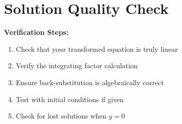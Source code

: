 \documentclass[12pt]{article}
\begin{document}
\section{Solution Quality Check}

\begin{keypoint}
\textbf{Verification Steps:}
\begin{enumerate}
    \item Check that your transformed equation is truly linear
    \item Verify the integrating factor calculation
    \item Ensure back-substitution is algebraically correct
    \item Test with initial conditions if given
    \item Check for lost solutions when $y = 0$
\end{enumerate}
\end{keypoint}
\end{document}
